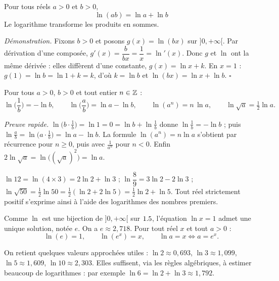 \begin{theoreme}
Pour tous réels $a>0$ et $b>0$,
\[
\boxed{\;\ln(ab)=\ln a+\ln b\;}
\]
Le logarithme transforme les produits en sommes.
\end{theoreme}

\noindent\textit{Démonstration.} Fixons $b>0$ et posons $g(x)=\ln(bx)$ sur $]0,+\infty[$.
Par dérivation d'une composée, $g'(x)=\dfrac{b}{bx}=\dfrac1x=\ln'(x)$. Donc $g$ et $\ln$
ont la même dérivée : elles diffèrent d'une constante, $g(x)=\ln x+k$. En $x=1$ :
$g(1)=\ln b=\ln 1+k=k$, d'où $k=\ln b$ et $\ln(bx)=\ln x+\ln b$. \hfill$\square$

\begin{propriete}
Pour tous $a>0$, $b>0$ et tout entier $n\in\mathbb{Z}$ :
\[
\ln\!\Big(\frac1b\Big)=-\ln b,\qquad
\ln\!\Big(\frac ab\Big)=\ln a-\ln b,\qquad
\ln(a^{n})=n\,\ln a,\qquad
\ln\sqrt a=\tfrac12\ln a.
\]
\end{propriete}

\noindent\textit{Preuve rapide.} $\ln\big(b\cdot\frac1b\big)=\ln 1=0=\ln b+\ln\frac1b$
donne $\ln\frac1b=-\ln b$ ; puis $\ln\frac ab=\ln\big(a\cdot\frac1b\big)=\ln a-\ln b$.
La formule $\ln(a^n)=n\ln a$ s'obtient par récurrence pour $n\ge0$, puis avec $\frac1{a^n}$
pour $n<0$. Enfin $2\ln\sqrt a=\ln\big((\sqrt a)^2\big)=\ln a$.

\begin{exemple}
$\ln 12=\ln(4\times3)=2\ln 2+\ln 3$ ; $\ln\dfrac{8}{9}=3\ln 2-2\ln 3$ ;
$\ln\sqrt{50}=\tfrac12\ln 50=\tfrac12(\ln 2+2\ln 5)=\tfrac12\ln 2+\ln 5$. Tout réel
strictement positif s'exprime ainsi à l'aide des logarithmes des nombres premiers.
\end{exemple}

\begin{definition}[Le nombre $e$]
Comme $\ln$ est une bijection de $]0,+\infty[$ sur $1.5$, l'équation $\ln x=1$ admet une
unique solution, notée $e$. On a $e\approx 2{,}718$. Pour tout réel $x$ et tout $a>0$ :
\[
\ln(e)=1,\qquad \ln(e^{x})=x,\qquad \ln a=x\iff a=e^{x}.
\]
\end{definition}

\begin{remarque}
On retient quelques valeurs approchées utiles : $\ln 2\approx0{,}693$, $\ln 3\approx1{,}099$,
$\ln 5\approx1{,}609$, $\ln 10\approx2{,}303$. Elles suffisent, via les règles algébriques,
à estimer beaucoup de logarithmes : par exemple $\ln 6=\ln 2+\ln 3\approx1{,}792$.
\end{remarque}

